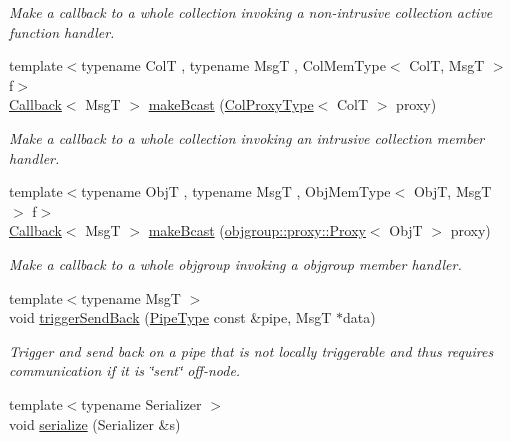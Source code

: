 \begin{DoxyCompactItemize}
\begin{DoxyCompactList}\small\item\em Make a callback to a whole collection invoking a non-\/intrusive collection active function handler. \end{DoxyCompactList}\item 
{\footnotesize template$<$typename ColT , typename MsgT , Col\+Mem\+Type$<$ Col\+T, Msg\+T $>$ f$>$ }\\\hyperlink{namespacevt_a36db99df4c973d48b1118a293fff533f}{Callback}$<$ MsgT $>$ \hyperlink{structvt_1_1pipe_1_1_pipe_manager_a6fb7d87f8beb2c1e80d492df47036158}{make\+Bcast} (\hyperlink{structvt_1_1pipe_1_1_pipe_manager_t_l_af56c58cad882496e35f01227d4da3898}{Col\+Proxy\+Type}$<$ ColT $>$ proxy)
\begin{DoxyCompactList}\small\item\em Make a callback to a whole collection invoking an intrusive collection member handler. \end{DoxyCompactList}\item 
{\footnotesize template$<$typename ObjT , typename MsgT , Obj\+Mem\+Type$<$ Obj\+T, Msg\+T $>$ f$>$ }\\\hyperlink{namespacevt_a36db99df4c973d48b1118a293fff533f}{Callback}$<$ MsgT $>$ \hyperlink{structvt_1_1pipe_1_1_pipe_manager_a4d561c17ce6861401a32892223e434c9}{make\+Bcast} (\hyperlink{structvt_1_1objgroup_1_1proxy_1_1_proxy}{objgroup\+::proxy\+::\+Proxy}$<$ ObjT $>$ proxy)
\begin{DoxyCompactList}\small\item\em Make a callback to a whole objgroup invoking a objgroup member handler. \end{DoxyCompactList}\item 
{\footnotesize template$<$typename MsgT $>$ }\\void \hyperlink{structvt_1_1pipe_1_1_pipe_manager_aaddd05d4eec8fbcbe8134f9c907a7306}{trigger\+Send\+Back} (\hyperlink{namespacevt_ac9852acda74d1896f48f406cd72c7bd3}{Pipe\+Type} const \&pipe, MsgT $\ast$data)
\begin{DoxyCompactList}\small\item\em Trigger and send back on a pipe that is not locally triggerable and thus requires communication if it is \char`\"{}sent\char`\"{} off-\/node. \end{DoxyCompactList}\item 
{\footnotesize template$<$typename Serializer $>$ }\\void \hyperlink{structvt_1_1pipe_1_1_pipe_manager_ae7b6be748d81eeeddb0cf84133bb8a7c}{serialize} (Serializer \&s)

\end{DoxyCompactItemize}
